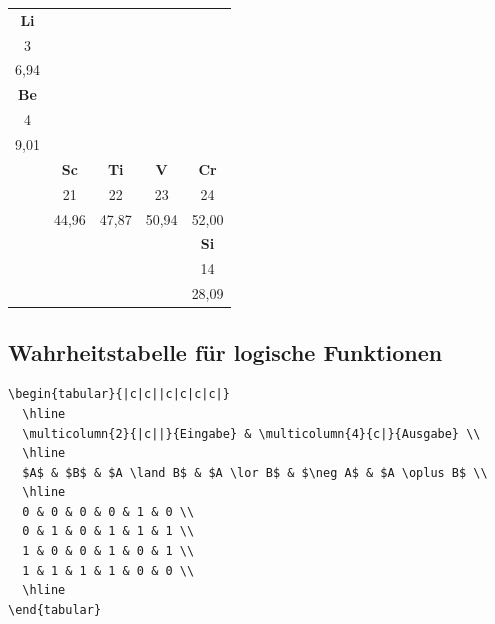 \documentclass[12pt,a4paper]{article}
\begin{document}
\begin{ausgabe}
\begin{center}

\begin{tabular}{|c|c|c|c|c|}
  \hline
  \rowcolor{alkali}
  \textbf{Li} & \multicolumn{4}{c|}{} \\
  3 & \multicolumn{4}{c|}{} \\
  6,94 & \multicolumn{4}{c|}{} \\
  \hline
  \rowcolor{erdalkali}
  \textbf{Be} & \multicolumn{4}{c|}{} \\
  4 & \multicolumn{4}{c|}{} \\
  9,01 & \multicolumn{4}{c|}{} \\
  \hline
  \multicolumn{1}{c}{} & 
  \textbf{Sc} & \textbf{Ti} & \textbf{V} & \textbf{Cr} \\
  \multicolumn{1}{c}{} & 21 & 22 & 23 & 24 \\
  \multicolumn{1}{c}{} & 44,96 & 47,87 & 50,94 & 52,00 \\
  \hline
  \multicolumn{1}{c}{} & \multicolumn{3}{c}{} &
  \textbf{Si} \\
  \multicolumn{1}{c}{} & \multicolumn{3}{c}{} & 14 \\
  \multicolumn{1}{c}{} & \multicolumn{3}{c}{} & 28,09 \\
  \hline
\end{tabular}
\end{center}
\end{ausgabe}

\subsection{Wahrheitstabelle für logische Funktionen}

\begin{lstlisting}[style=latex]
\begin{tabular}{|c|c||c|c|c|c|}
  \hline
  \multicolumn{2}{|c||}{Eingabe} & \multicolumn{4}{c|}{Ausgabe} \\
  \hline
  $A$ & $B$ & $A \land B$ & $A \lor B$ & $\neg A$ & $A \oplus B$ \\
  \hline
  0 & 0 & 0 & 0 & 1 & 0 \\
  0 & 1 & 0 & 1 & 1 & 1 \\
  1 & 0 & 0 & 1 & 0 & 1 \\
  1 & 1 & 1 & 1 & 0 & 0 \\
  \hline
\end{tabular}
\end{lstlisting}
\end{document}
